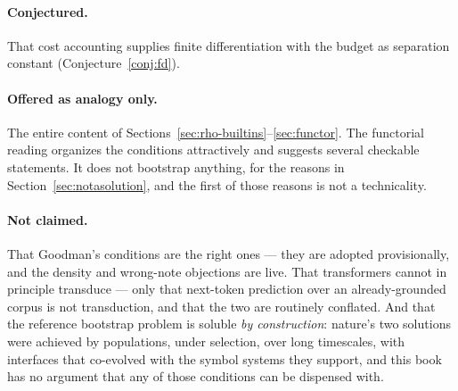 \paragraph{Conjectured.}
That cost accounting supplies finite differentiation with the
budget as separation constant (Conjecture~\ref{conj:fd}).

\paragraph{Offered as analogy only.}
The entire content of
Sections~\ref{sec:rho-builtins}--\ref{sec:functor}.
The functorial reading organizes the conditions attractively and
suggests several checkable statements.
It does not bootstrap anything, for the reasons in
Section~\ref{sec:notasolution}, and the first of those reasons is
not a technicality.

\paragraph{Not claimed.}
That Goodman's conditions are the right ones --- they are adopted
provisionally, and the density and wrong-note objections are live.
That transformers cannot in principle transduce --- only that
next-token prediction over an already-grounded corpus is not
transduction, and that the two are routinely conflated.
And that the reference bootstrap problem is soluble \emph{by
construction}: nature's two solutions were achieved by populations,
under selection, over long timescales, with interfaces that
co-evolved with the symbol systems they support, and this book has
no argument that any of those conditions can be dispensed with.
